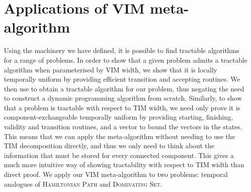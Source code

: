 \documentclass[a4paper,UKenglish,cleveref, autoref, thm-restate]{lipics-v2021} %
\begin{document}

\section{Applications of VIM meta-algorithm}\label{sec:applications-vim}

Using the machinery we have defined, it is possible to find tractable algorithms for a range of problems. In order to show that a given problem admits a tractable algorithm when parameterised by VIM width, we show that it is locally temporally uniform by providing efficient transition and accepting routines. We then use  to obtain a tractable algorithm for our problem, thus negating the need to construct a dynamic programming algorithm from scratch. Similarly, to show that a problem is tractable with respect to TIM width, we need only prove it is component-exchangeable temporally uniform by providing starting, finishing, validity and transition routines, and a vector to bound the vectors in the states. This means that we can apply the meta-algorithm without needing to use the TIM decomposition directly, and thus we only need to think about the information that must be stored for every connected component. This gives a much more intuitive way of showing tractability with respect to TIM width than direct proof. 
% 
% 
We apply our VIM meta-algorithm to two problems: temporal analogues of \textsc{Hamiltonian Path} and \textsc{Dominating Set}. 
\end{document}
